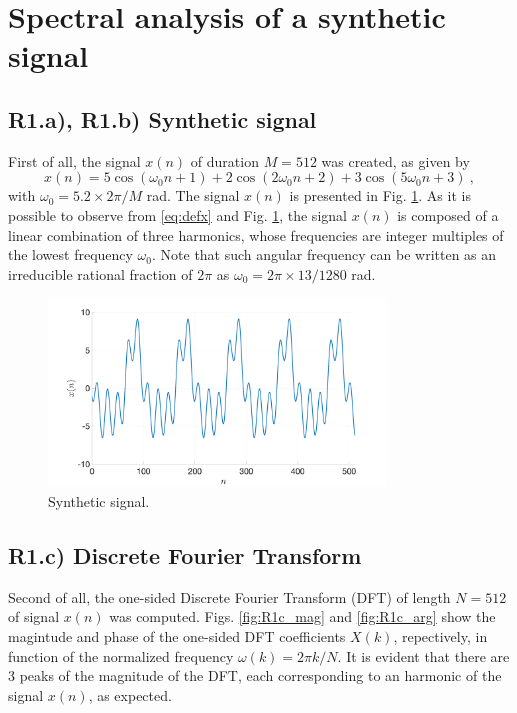 \documentclass[a4paper, oneside, 11pt]{article}
\begin{document}
\newpage
{}
\setcounter{page}{1}


\section{Spectral analysis of a synthetic signal}

\subsection{R1.a), R1.b) Synthetic signal}\label{sec:R1a}
First of all, the signal $x(n)$ of duration $M=512$ was created, as given by 
\begin{equation}\label{eq:defx}
	x(n) = 5\cos(\omega_0 n +1)+2\cos(2\omega_0 n +2)+3\cos(5\omega_0 n +3)\:,
\end{equation}
with $\omega_0 = 5.2\times 2\pi/M$ rad. The signal $x(n)$ is presented in Fig. \ref{fig:R1b}. As it is possible to observe from \eqref{eq:defx} and Fig. \ref{fig:R1b}, the signal $x(n)$ is composed of a linear combination of three harmonics, whose frequencies are integer multiples of the lowest frequency $\omega_0$. Note that such angular frequency can be written as an irreducible rational fraction of $2\pi$ as $\omega_0 = 2\pi \times 13/1280$ rad.
\begin{figure}[htbp]
	\centering
	\includegraphics[width= 0.8\textwidth]{figures/R1b.png}
	\caption{Synthetic signal.}
	\label{fig:R1b}
\end{figure}

\subsection{R1.c) Discrete Fourier Transform}

Second of all, the one-sided Discrete Fourier Transform (DFT) of length $N= 512$ of signal $x(n)$ was computed. Figs. \ref{fig:R1c_mag} and \ref{fig:R1c_arg} show the magintude and phase of the one-sided DFT coefficients $X(k)$, repectively, in function of the normalized frequency $\omega(k) = 2\pi k/N$. It is evident that there are 3 peaks of the magnitude of the DFT, each corresponding to an harmonic of the signal $x(n)$, as expected.
\end{document}
